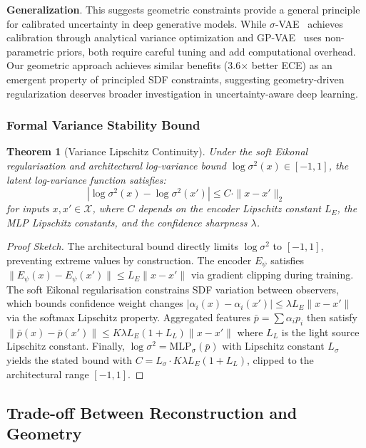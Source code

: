 \documentclass[10pt,twocolumn,letterpaper]{article}
\newtheorem{theorem}{Theorem}
\begin{document}
\textbf{Generalization}. This suggests geometric constraints provide a general principle for calibrated uncertainty in deep generative models. While $\sigma$-VAE~\cite{sigma_vae} achieves calibration through analytical variance optimization and GP-VAE~\cite{gaussian_process_encoders} uses non-parametric priors, both require careful tuning and add computational overhead. Our geometric approach achieves similar benefits (3.6$\times$ better ECE) as an emergent property of principled SDF constraints, suggesting geometry-driven regularization deserves broader investigation in uncertainty-aware deep learning.

\subsubsection{Formal Variance Stability Bound}

\begin{theorem}[Variance Lipschitz Continuity]
Under the soft Eikonal regularisation and architectural log-variance bound $\log\sigma^2(x) \in [-1, 1]$, the latent log-variance function satisfies:
\begin{equation}
|\log\sigma^2(x) - \log\sigma^2(x')| \leq C \cdot \|x - x'\|_2
\end{equation}
for inputs $x, x' \in \mathcal{X}$, where $C$ depends on the encoder Lipschitz constant $L_E$, the MLP Lipschitz constants, and the confidence sharpness $\lambda$.
\end{theorem}

\begin{proof}[Proof Sketch]
The architectural bound directly limits $\log\sigma^2$ to $[-1,1]$, preventing extreme values by construction. The encoder $E_\psi$ satisfies $\|E_\psi(x) - E_\psi(x')\| \leq L_E\|x - x'\|$ via gradient clipping during training. The soft Eikonal regularisation constrains SDF variation between observers, which bounds confidence weight changes $|\alpha_i(x) - \alpha_i(x')| \leq \lambda L_E \|x - x'\|$ via the softmax Lipschitz property. Aggregated features $\bar{p} = \sum \alpha_i p_i$ then satisfy $\|\bar{p}(x) - \bar{p}(x')\| \leq K\lambda L_E(1 + L_L)\|x - x'\|$ where $L_L$ is the light source Lipschitz constant. Finally, $\log\sigma^2 = \text{MLP}_\sigma(\bar{p})$ with Lipschitz constant $L_\sigma$ yields the stated bound with $C = L_\sigma \cdot K\lambda L_E(1 + L_L)$, clipped to the architectural range $[-1,1]$.
\end{proof}

\subsection{Trade-off Between Reconstruction and Geometry}
\end{document}
